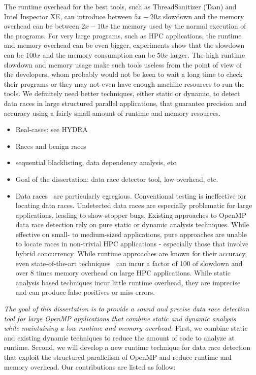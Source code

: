 The runtime overhead for the best tools, such as ThreadSanitizer (Tsan) and
Intel Inspector XE, can introduce between $5x-20x$ slowdown and the memory
overhead can be between $2x-10x$ the memory used by the normal execution of
the programs.
%
For very large programs, such as HPC applications, the runtime and memory
overhead can be even bigger, experiments show that the slowdown can be $100x$
and the memory consumption can be $50x$ larger.
%
The high runtime slowdown and memory usage make such tools useless from the
point of view of the developers, whom probably would not be keen to wait a
long time to check their programs or they may not even have enough machine
resources to run the tools.
%
We definitely need better techniques, either static or dynamic, to detect data
races in large structured parallel applications, that guarantee precision and
accuracy using a fairly small amount of runtime and memory resources.

\begin{itemize}
  \item Real-cases: see HYDRA
  \item Races and benign races
  \item sequential blacklisting, data dependency analysis, etc.
  \item Goal of the dissertation: data race detector tool, low overhead, etc.
  \item Data races~\cite{sus_common_2008} are particularly egregious.
    Conventional testing is ineffective for locating data races.
    Undetected data races are especially problematic for large applications,
    leading to show-stopper bugs.
    Existing approaches to OpenMP data race detection rely on pure static or
    dynamic analysis techniques.
    While effective on small- to medium-sized applications, pure approaches
    are unable to locate races in non-trivial HPC applications - especially
    those that involve hybrid concurrency.
    While runtime approaches are known for their accuracy, even
    state-of-the-art techniques~\cite{Flanagan:2009,tsan} can incur
    a factor of 100 of slowdown and over 8 times memory overhead on large HPC
    applications.
    While static analysis based techniques incur little runtime overhead, they
    are imprecise and can produce false positives or miss errors.
\end{itemize}

\emph{The goal of this dissertation is to provide a sound and precise data
  race detection tool for large OpenMP applications that combine static and
  dynamic analysis while maintaining a low runtime and memory overhead.}
%
First, we combine static and existing dynamic techniques to reduce the amount
of code to analyze at runtime.
%
Second, we will develop a new runtime technique for data race detection that
exploit the structured parallelism of OpenMP and reduce runtime and memory
overhead.
%
Our contributions are listed as follow:

